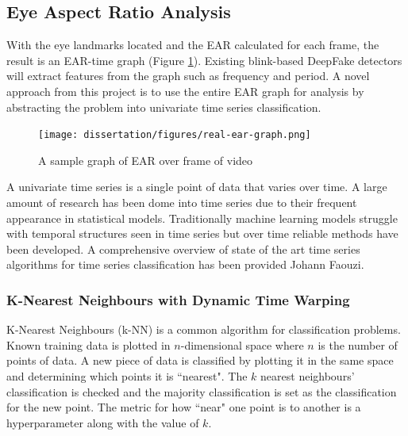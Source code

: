 \subsection{Eye Aspect Ratio Analysis}


With the eye landmarks located and the EAR calculated for each frame, the result is an EAR-time graph (Figure \ref{fig:real-ear-graph}). Existing blink-based DeepFake detectors will extract features from the graph such as frequency and period. A novel approach from this project is to use the entire EAR graph for analysis by abstracting the problem into univariate time series classification.

\begin{figure}[h]
    \centering
    \texttt{[image: dissertation/figures/real-ear-graph.png]}
    \caption{A sample graph of EAR over frame of video}
    \label{fig:real-ear-graph}
\end{figure}

A univariate time series is a single point of data that varies over time. A large amount of research has been dome into time series due to their frequent appearance in statistical models. Traditionally machine learning models struggle with temporal structures seen in time series but over time reliable methods have been developed. A comprehensive overview of state of the art time series algorithms for time series classification has been provided Johann Faouzi\cite{faouzi2024time}.

\subsubsection{K-Nearest Neighbours with Dynamic Time Warping}

K-Nearest Neighbours (k-NN) is a common algorithm for classification problems. Known training data is plotted in $n$-dimensional space where $n$ is the number of points of data. A new piece of data is classified by plotting it in the same space and determining which points it is ``nearest". The $k$ nearest neighbours' classification is checked and the majority classification is set as the classification for the new point. The metric for how ``near" one point is to another is a hyperparameter along with the value of $k$.

